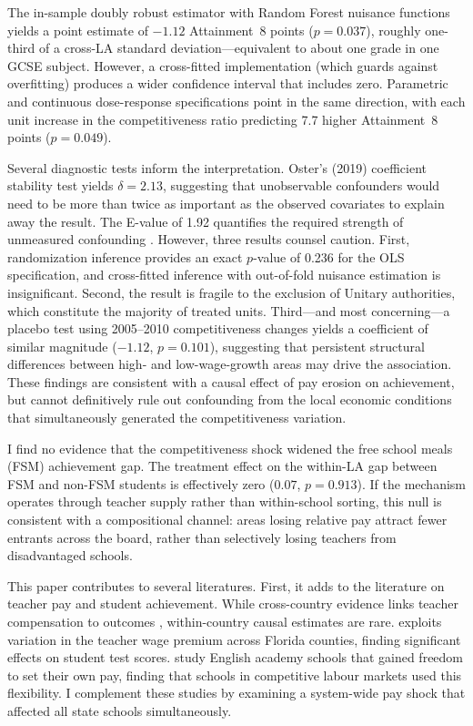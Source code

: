 \documentclass[12pt]{article}
\begin{document}
The in-sample doubly robust estimator with Random Forest nuisance functions yields a point estimate of $-1.12$ Attainment~8 points ($p = 0.037$), roughly one-third of a cross-LA standard deviation---equivalent to about one grade in one GCSE subject. However, a cross-fitted implementation (which guards against overfitting) produces a wider confidence interval that includes zero. Parametric and continuous dose-response specifications point in the same direction, with each unit increase in the competitiveness ratio predicting 7.7 higher Attainment~8 points ($p = 0.049$).

Several diagnostic tests inform the interpretation. Oster's (2019) coefficient stability test yields $\delta = 2.13$, suggesting that unobservable confounders would need to be more than twice as important as the observed covariates to explain away the result. The E-value of 1.92 quantifies the required strength of unmeasured confounding \citep{vanderweele2017sensitivity}. However, three results counsel caution. First, randomization inference provides an exact $p$-value of 0.236 for the OLS specification, and cross-fitted inference with out-of-fold nuisance estimation is insignificant. Second, the result is fragile to the exclusion of Unitary authorities, which constitute the majority of treated units. Third---and most concerning---a placebo test using 2005--2010 competitiveness changes yields a coefficient of similar magnitude ($-1.12$, $p = 0.101$), suggesting that persistent structural differences between high- and low-wage-growth areas may drive the association. These findings are consistent with a causal effect of pay erosion on achievement, but cannot definitively rule out confounding from the local economic conditions that simultaneously generated the competitiveness variation.

I find no evidence that the competitiveness shock widened the free school meals (FSM) achievement gap. The treatment effect on the within-LA gap between FSM and non-FSM students is effectively zero ($0.07$, $p = 0.913$). If the mechanism operates through teacher supply rather than within-school sorting, this null is consistent with a compositional channel: areas losing relative pay attract fewer entrants across the board, rather than selectively losing teachers from disadvantaged schools.

This paper contributes to several literatures. First, it adds to the literature on teacher pay and student achievement. While cross-country evidence links teacher compensation to outcomes \citep{dolton2011if}, within-country causal estimates are rare. \citet{hendricks2014relative} exploits variation in the teacher wage premium across Florida counties, finding significant effects on student test scores. \citet{britton2016teacher} study English academy schools that gained freedom to set their own pay, finding that schools in competitive labour markets used this flexibility. I complement these studies by examining a system-wide pay shock that affected all state schools simultaneously.
\end{document}
